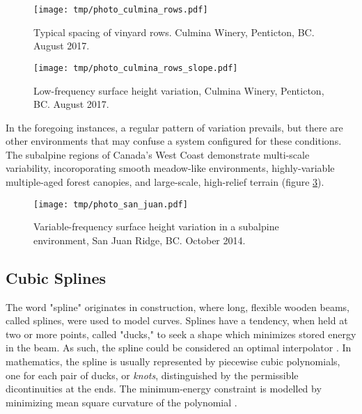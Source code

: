 \documentclass[10pt]{article}
\begin{document}
\begin{figure} %
\texttt{[image: tmp/photo\_culmina\_rows.pdf]} 
\caption{Typical spacing of vinyard rows. Culmina Winery, Penticton, BC. August 2017.}
\label{fig:photo_culmina_rows}
\end{figure}

\begin{figure} %
\texttt{[image: tmp/photo\_culmina\_rows\_slope.pdf]} 
\caption{Low-frequency surface height variation, Culmina Winery, Penticton, BC. August 2017.}
\label{fig:photo_culmina_rows_slope}
\end{figure}

In the foregoing instances, a regular pattern of variation prevails, but there are other environments that may confuse a system configured for these conditions. The subalpine regions of Canada's West Coast demonstrate multi-scale variability, incoroporating smooth meadow-like environments, highly-variable multiple-aged forest canopies, and large-scale, high-relief terrain (figure \ref{fig:photo_san_juan}).

\begin{figure} %
\begin{center}
\texttt{[image: tmp/photo\_san\_juan.pdf]} 
\end{center}
\caption{Variable-frequency surface height variation in a subalpine environment, San Juan Ridge, BC. October 2014.}
\label{fig:photo_san_juan}
\end{figure}



\subsection{Cubic Splines}

The word "spline" originates in construction, where long, flexible wooden beams, called splines, were used to model curves. Splines have a tendency, when held at two or more points, called "ducks," to seek a shape which minimizes stored energy in the beam. As such, the spline could be considered an optimal interpolator \cite{Wegman2016}. In mathematics, the spline is usually represented by piecewise cubic polynomials, one for each pair of ducks, or \emph{knots}, distinguished by the permissible dicontinuities at the ends. The minimum-energy constraint is modelled by minimizing mean square curvature of the polynomial \cite{Wegman2016}.
\end{document}
